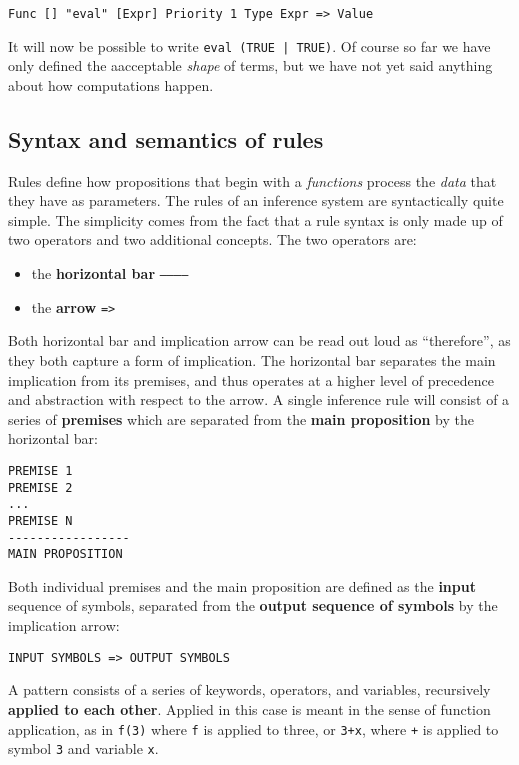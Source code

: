 \begin{lstlisting}
Func [] "eval" [Expr] Priority 1 Type Expr => Value
\end{lstlisting}

It will now be possible to write \texttt{eval (TRUE | TRUE)}. Of course so far we have only defined the aacceptable \textit{shape} of terms, but we have not yet said anything about how computations happen.

\subsection{Syntax and semantics of rules}
Rules define how propositions that begin with a \textit{functions} process the \textit{data} that they have as parameters. The rules of an inference system are syntactically quite simple. The simplicity comes from the fact that a rule syntax is only made up of two operators and two additional concepts. The two operators are:

\begin{itemize}
\item the \textbf{horizontal bar} \texttt{------------}
\item the \textbf{arrow} \texttt{=>}
\end{itemize}

Both horizontal bar and implication arrow can be read out loud as ``therefore'', as they both capture a form of implication. The horizontal bar separates the main implication from its premises, and thus operates at a higher level of precedence and abstraction with respect to the arrow. A single inference rule will consist of a series of \textbf{premises} which are separated from the \textbf{main proposition} by the horizontal bar:

\begin{lstlisting}
PREMISE 1
PREMISE 2
...
PREMISE N
-----------------
MAIN PROPOSITION
\end{lstlisting}

Both individual premises and the main proposition are defined as the \textbf{input} sequence of symbols, separated from the \textbf{output sequence of symbols} by the implication arrow:

\begin{lstlisting}
INPUT SYMBOLS => OUTPUT SYMBOLS
\end{lstlisting}

A pattern consists of a series of keywords, operators, and variables, recursively \textbf{applied to each other}. Applied in this case is meant in the sense of function application, as in \texttt{f(3)} where \texttt{f} is applied to three, or \texttt{3+x}, where \texttt{+} is applied to symbol \texttt{3} and variable \texttt{x}. 

